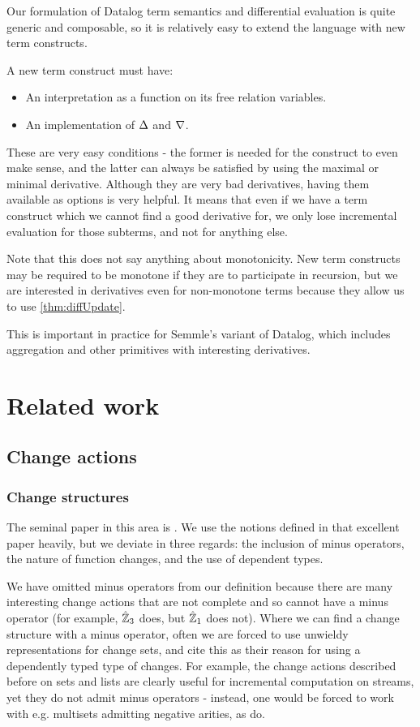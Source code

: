 Our formulation of Datalog term semantics and differential evaluation is quite
generic and composable, so it is relatively easy to extend the language with new
term constructs.

A new term construct must have:
\begin{itemize}
  \item An interpretation as a function on its free relation variables.
  \item An implementation of $\Delta$ and $\nabla$.
\end{itemize}

These are very easy conditions - the former is needed for the construct to even
make sense, and the latter can always be satisfied by using the maximal or
minimal derivative. Although they are very bad derivatives, having them
available as options is very helpful. It means that even if we have a term
construct which we cannot find a good derivative for, we only lose incremental
evaluation for those subterms, and not for anything else.

Note that this does not say anything about monotonicity. New term constructs may
be required to be monotone if they are to participate in recursion, but we are
interested in derivatives even for non-monotone terms because they allow us to
use \cref{thm:diffUpdate}.

This is important in practice for Semmle's variant of Datalog, which includes
aggregation and other primitives with interesting derivatives.

\section{Related work}

\subsection{Change actions}

\subsubsection{Change structures}
\label{sec:relatedChangeStructures}

The seminal paper in this area is \textcite{cai2014changes}. We use the notions
defined in that excellent paper heavily, but we deviate in three regards: the
inclusion of minus operators, the nature of function changes, and the use of
dependent types.

We have omitted minus operators from our definition because
there are many interesting change actions that are not complete and so cannot
have a minus operator (for example, $\hat{\mathbb{Z}}_3$ does, but $\hat{\mathbb{Z}}_1$ does
not). Where we can find a change structure with a minus operator, often we are
forced to use unwieldy representations for change sets, and
\citeauthor{cai2014changes} cite this as their reason for using a dependently
typed type of changes. For example, the change actions described before on sets and lists are clearly
useful for incremental computation on streams, yet they do not admit minus operators - instead, one would
be forced to work with e.g. multisets admitting negative arities, as \citeauthor{cai2014changes} do.

